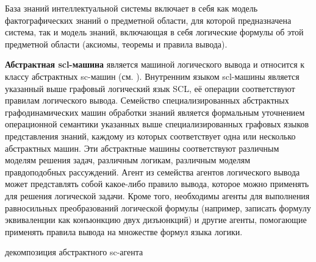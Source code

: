 База знаний интеллектуальной системы включает в себя как модель фактографических знаний о предметной области, для которой предназначена система, так и модель знаний, включающая в себя логические формулы об этой предметной области (аксиомы, теоремы и правила вывода).

\textbf{Абстрактная scl-машина} является машиной логического вывода и относится к классу абстрактных sc-машин (см. ). Внутренним языком scl-машины является указанный выше графовый логический язык SCL, её операции соответствуют правилам логического вывода. Семейство специализированных абстрактных графодинамических машин обработки знаний является формальным уточнением операционной семантики указанных выше специализированных графовых языков представления знаний, каждому из которых соответствует одна или несколько абстрактных машин. Эти абстрактные машины соответствуют различным моделям решения задач, различным логикам, различным моделям правдоподобных рассуждений. 
Агент из семейства агентов логического вывода может представлять собой какое-либо правило вывода, которое можно применять для решения логической задачи. Кроме того, необходимы агенты для выполнения равносильных преобразований логической формулы (например, записать формулу эквиваленции как конъюнкцию двух дизъюнкций) и другие агенты, помогающие применять правила вывода на множестве формул языка логики.

\begin{SCn}
	\begin{scnrelfromset}{декомпозиция абстрактного sc-агента}
	\end{scnrelfromset}
\begin{scnindent}
\end{scnindent}
\end{SCn}

